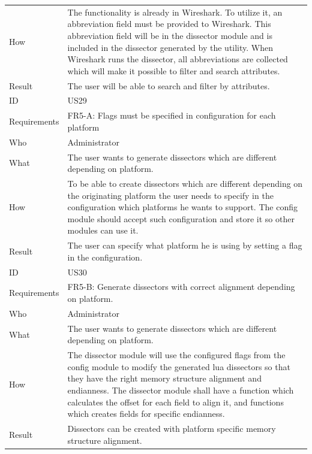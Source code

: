 \begin{table}[htbp]
{\begin{tabularx}{1.2\textwidth}{l X}
	How & The functionality is already in Wireshark. To utilize it, an abbreviation field must be provided to Wireshark. This abbreviation field will 	be in the dissector 		module and is included in the dissector generated by the utility. When Wireshark runs the dissector, all abbreviations are collected which will make it possible to 		filter and search attributes. \\
	Result & The user will be able to search and filter by attributes. \\
	\midrule
	ID & US29 \\
	Requirements & FR5-A: Flags must be specified in configuration for each platform \\
	Who & Administrator \\
	What & The user wants to generate dissectors which are different depending on platform. \\
	How & To be able to create dissectors which are different depending on the originating platform the user needs to specify in the 				configuration which platforms he wants to support. The config module should accept such configuration and store it so other modules
	can use it. \\ 
	Result & The user can specify what platform he is using by setting a flag in the configuration. \\
	\midrule
	ID & US30 \\
	Requirements & FR5-B: Generate dissectors with correct alignment depending on platform.\\
	Who & Administrator \\
	What & The user wants to generate dissectors which are different depending on platform. \\
	How & The dissector module will use the configured flags from the config module to modify the generated lua dissectors so that they have 			the right memory structure alignment and endianness. The dissector module shall have a function which calculates the offset for each field 			to align it, and functions which creates fields for specific endianness. \\
	Result & Dissectors can be created with platform specific memory structure alignment. \\
	\bottomrule
\end{tabularx}}
\end{table}

